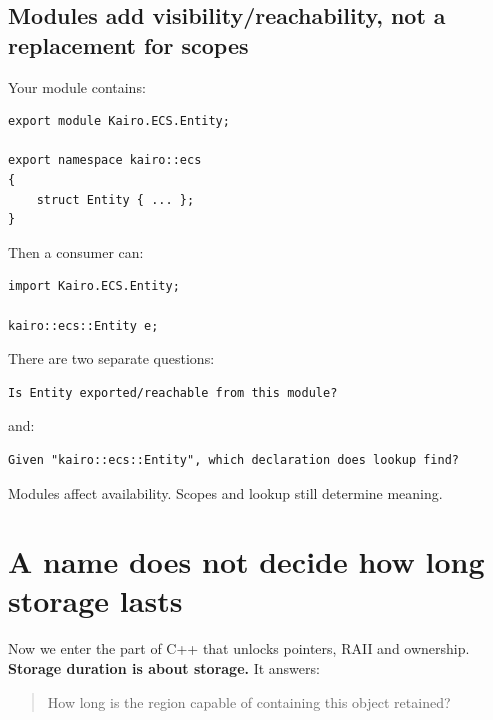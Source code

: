 \subsection{Modules add visibility/reachability, not a replacement for scopes}\label{05-engine-i-ch002-modules-add-visibilityreachability-not-a-replacement-for-scopes}

\hypertarget{05-engine-i-ch002-modules-add-visibilityreachability-not-a-replacement-for-scopes}{}

Your module contains:

\begin{verbatim}
export module Kairo.ECS.Entity;

export namespace kairo::ecs
{
    struct Entity { ... };
}
\end{verbatim}

Then a consumer can:

\begin{verbatim}
import Kairo.ECS.Entity;

kairo::ecs::Entity e;
\end{verbatim}

There are two separate questions:

\begin{verbatim}
Is Entity exported/reachable from this module?
\end{verbatim}

and:

\begin{verbatim}
Given "kairo::ecs::Entity", which declaration does lookup find?
\end{verbatim}

Modules affect availability. Scopes and lookup still determine meaning.

\section{A name does not decide how long storage lasts}\label{05-engine-i-ch002-a-name-does-not-decide-how-long-storage-lasts}

\hypertarget{05-engine-i-ch002-a-name-does-not-decide-how-long-storage-lasts}{}

Now we enter the part of C++ that unlocks pointers, RAII and ownership. \textbf{Storage duration is about storage.} It answers:

\begin{quote}
How long is the region capable of containing this object retained?
\end{quote}

